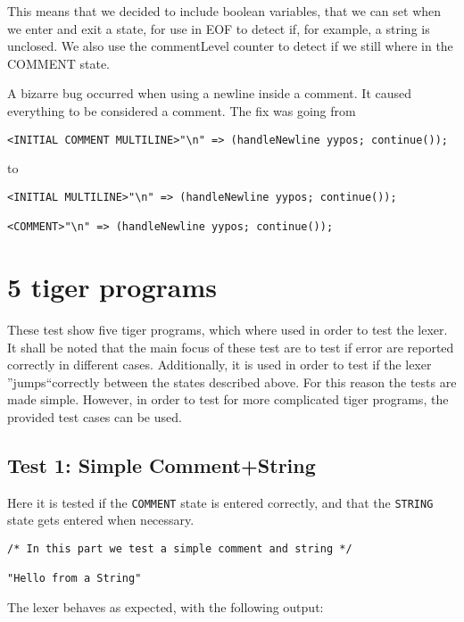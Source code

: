 \documentclass{article}
\begin{document}
This means that we decided to include boolean variables, that we can set when we enter and exit a state, for use in EOF to detect if, for example, a string is unclosed. We also use the commentLevel counter to detect if we still where in the COMMENT state.




A bizarre bug occurred when using a newline inside a comment. It caused everything to be considered a comment. The fix was going from
\begin{lstlisting}[frame=single]
<INITIAL COMMENT MULTILINE>"\n" => (handleNewline yypos; continue());
\end{lstlisting}
to
\begin{lstlisting}[frame=single]
<INITIAL MULTILINE>"\n" => (handleNewline yypos; continue());

<COMMENT>"\n" => (handleNewline yypos; continue());
\end{lstlisting}

\section{5 tiger programs}
These test show five tiger programs, which where used in order to test the lexer. It shall be noted that the main focus of these test are to test if error are reported correctly in different cases. Additionally, it is used in order to test if the lexer ''jumps``correctly between the states described above. For this reason the tests are made simple. However, in order to test for more complicated tiger programs, the provided test cases can be used.  

\subsection{Test 1: Simple Comment+String}
Here it is tested if the \texttt{COMMENT} state is entered correctly, and that the \texttt{STRING} state gets entered when necessary.

\begin{lstlisting}[frame=single]
/* In this part we test a simple comment and string */

"Hello from a String"
\end{lstlisting}

The lexer behaves as expected, with the following output:
\end{document}

